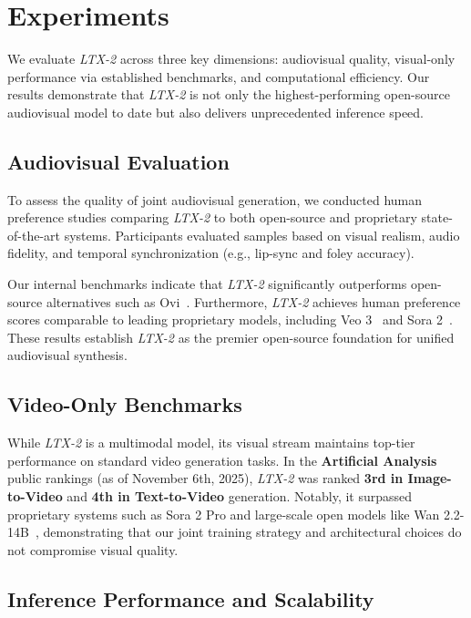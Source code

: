 \documentclass{article}
\begin{document}
\section{Experiments}

We evaluate \textit{LTX-2} across three key dimensions: audiovisual quality, visual-only performance via established benchmarks, and computational efficiency. Our results demonstrate that \textit{LTX-2} is not only the highest-performing open-source audiovisual model to date but also delivers unprecedented inference speed.

\subsection{Audiovisual Evaluation}

To assess the quality of joint audiovisual generation, we conducted human preference studies comparing \textit{LTX-2} to both open-source and proprietary state-of-the-art systems. Participants evaluated samples based on visual realism, audio fidelity, and temporal synchronization (e.g., lip-sync and foley accuracy).

Our internal benchmarks indicate that \textit{LTX-2} significantly outperforms open-source alternatives such as Ovi~\cite{ovi2025}. Furthermore, \textit{LTX-2} achieves human preference scores comparable to leading proprietary models, including Veo 3~\cite{veo32025} and Sora 2~\cite{sora22025}. These results establish \textit{LTX-2} as the premier open-source foundation for unified audiovisual synthesis.

\subsection{Video-Only Benchmarks}

While \textit{LTX-2} is a multimodal model, its visual stream maintains top-tier performance on standard video generation tasks. In the \textbf{Artificial Analysis} public rankings (as of November 6th, 2025), \textit{LTX-2} was ranked \textbf{3rd in Image-to-Video} and \textbf{4th in Text-to-Video} generation. Notably, it surpassed proprietary systems such as Sora 2 Pro and large-scale open models like Wan 2.2-14B~\cite{wang2025wan}, demonstrating that our joint training strategy and architectural choices do not compromise visual quality.

\subsection{Inference Performance and Scalability}
\end{document}
